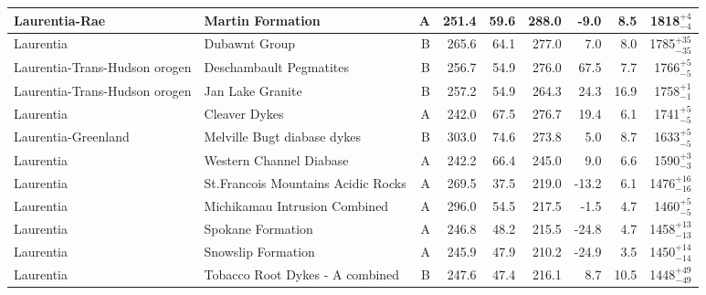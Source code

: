 \begin{longtable}{p{1 in}p{1 in}rrrrrrr}
                 Laurentia-Rae &                                   Martin Formation &      A &     251.4 &      59.6 & 288.0 &  -9.0 &       8.5 &     1818$^{+4}_{-4}$ \\ \hline
                     Laurentia &                                      Dubawnt Group &      B &     265.6 &      64.1 & 277.0 &   7.0 &       8.0 &   1785$^{+35}_{-35}$ \\ \hline
 Laurentia-Trans-Hudson orogen &                            Deschambault Pegmatites &      B &     256.7 &      54.9 & 276.0 &  67.5 &       7.7 &     1766$^{+5}_{-5}$ \\ \hline
 Laurentia-Trans-Hudson orogen &                                   Jan Lake Granite &      B &     257.2 &      54.9 & 264.3 &  24.3 &      16.9 &     1758$^{+1}_{-1}$ \\ \hline
                     Laurentia &                                      Cleaver Dykes &      A &     242.0 &      67.5 & 276.7 &  19.4 &       6.1 &     1741$^{+5}_{-5}$ \\ \hline
           Laurentia-Greenland &                        Melville Bugt diabase dykes &      B &     303.0 &      74.6 & 273.8 &   5.0 &       8.7 &     1633$^{+5}_{-5}$ \\ \hline
                     Laurentia &                            Western Channel Diabase &      A &     242.2 &      66.4 & 245.0 &   9.0 &       6.6 &     1590$^{+3}_{-3}$ \\ \hline
                     Laurentia &                 St.Francois Mountains Acidic Rocks &      A &     269.5 &      37.5 & 219.0 & -13.2 &       6.1 &   1476$^{+16}_{-16}$ \\ \hline
                     Laurentia &                      Michikamau Intrusion Combined &      A &     296.0 &      54.5 & 217.5 &  -1.5 &       4.7 &     1460$^{+5}_{-5}$ \\ \hline
                     Laurentia &                                  Spokane Formation &      A &     246.8 &      48.2 & 215.5 & -24.8 &       4.7 &   1458$^{+13}_{-13}$ \\ \hline
                     Laurentia &                                 Snowslip Formation &      A &     245.9 &      47.9 & 210.2 & -24.9 &       3.5 &   1450$^{+14}_{-14}$ \\ \hline
                     Laurentia &                    Tobacco Root Dykes - A combined &      B &     247.6 &      47.4 & 216.1 &   8.7 &      10.5 &   1448$^{+49}_{-49}$ \\ \hline

\end{longtable}
